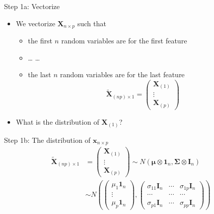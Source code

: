 \documentclass[
  ignorenonframetext,
]{beamer}
\providecommand{\tightlist}{%
  \setlength{\itemsep}{0pt}\setlength{\parskip}{0pt}}
\begin{document}
\begin{frame}{Step 1a: Vectorize}
\protect\hypertarget{step-1a-vectorize}{}
\begin{itemize}
\tightlist
\item
  We vectorize \(\mathbf X_{n\times p}\) such that

  \begin{itemize}
  \tightlist
  \item
    the first \(n\) random variables are for the first feature
  \item
    \ldots{} \ldots{}
  \item
    the last \(n\) random variables are for the last feature
    \[\tilde {\mathbf X}_{(np)\times 1}=
    \begin{pmatrix}
    \mathbf X_{(1)}\\ \vdots \\ \mathbf X_{(p)} \end{pmatrix}\]
  \end{itemize}
\item
  What is the distribution of \(\mathbf X_{(1)}\)?
\end{itemize}
\end{frame}

\begin{frame}{Step 1b: The distribution of \(\mathbf x_{n\times p}\)}
\protect\hypertarget{step-1b-the-distribution-of-mathbf-x_ntimes-p}{}
\[
\begin{aligned}
\tilde {\mathbf X}_{(np)\times 1} &=
\begin{pmatrix}
\mathbf X_{(1)}\\ \vdots \\ \mathbf X_{(p)} \end{pmatrix}
\sim N(\boldsymbol \mu \otimes\mathbf 1_n, 
\boldsymbol \Sigma \otimes \mathbf I_n)\\
&\sim 
N (
\begin{pmatrix}\mu_1 \mathbf 1_n \\ \vdots \\\mu_p \mathbf 1_n\end{pmatrix},  
\begin{pmatrix}
\sigma_{11}\mathbf I_n & \cdots & \sigma_{1p}\mathbf I_n\\
\cdots & \cdots & \cdots \\
\sigma_{p1}\mathbf I_n & \cdots & \sigma_{pp}\mathbf I_n
\end{pmatrix})
\end{aligned}
\]
\end{frame}
\end{document}
